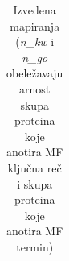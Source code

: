 \begin{table}[htpb]
\begin{tabular}{|p{6cm}|p{0.7cm}|p{0.5cm}|p{0.7cm}|p{8cm}|}

\end{tabular}
  \caption{Izvedena mapiranja \small 
  (\textit{n\_kw} i \textit{n\_go} obeležavaju arnost skupa proteina koje anotira MF ključna reč i skupa proteina koje anotira MF termin) }
  \label{tab:izvedeno_mapiranje}
\end{table}


